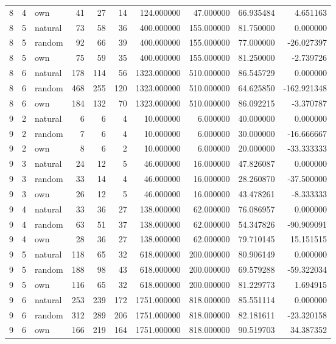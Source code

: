 \begin{table}[htbp]
\begin{tabular}{rrlrrrrrrr}
8 & 4 & own & 41 & 27 & 14 & 124.000000 & 47.000000 & 66.935484 & 4.651163 \\
8 & 5 & natural & 73 & 58 & 36 & 400.000000 & 155.000000 & 81.750000 & 0.000000 \\
8 & 5 & random & 92 & 66 & 39 & 400.000000 & 155.000000 & 77.000000 & -26.027397 \\
8 & 5 & own & 75 & 59 & 35 & 400.000000 & 155.000000 & 81.250000 & -2.739726 \\
8 & 6 & natural & 178 & 114 & 56 & 1323.000000 & 510.000000 & 86.545729 & 0.000000 \\
8 & 6 & random & 468 & 255 & 120 & 1323.000000 & 510.000000 & 64.625850 & -162.921348 \\
8 & 6 & own & 184 & 132 & 70 & 1323.000000 & 510.000000 & 86.092215 & -3.370787 \\
9 & 2 & natural & 6 & 6 & 4 & 10.000000 & 6.000000 & 40.000000 & 0.000000 \\
9 & 2 & random & 7 & 6 & 4 & 10.000000 & 6.000000 & 30.000000 & -16.666667 \\
9 & 2 & own & 8 & 6 & 2 & 10.000000 & 6.000000 & 20.000000 & -33.333333 \\
9 & 3 & natural & 24 & 12 & 5 & 46.000000 & 16.000000 & 47.826087 & 0.000000 \\
9 & 3 & random & 33 & 14 & 4 & 46.000000 & 16.000000 & 28.260870 & -37.500000 \\
9 & 3 & own & 26 & 12 & 5 & 46.000000 & 16.000000 & 43.478261 & -8.333333 \\
9 & 4 & natural & 33 & 36 & 27 & 138.000000 & 62.000000 & 76.086957 & 0.000000 \\
9 & 4 & random & 63 & 51 & 37 & 138.000000 & 62.000000 & 54.347826 & -90.909091 \\
9 & 4 & own & 28 & 36 & 27 & 138.000000 & 62.000000 & 79.710145 & 15.151515 \\
9 & 5 & natural & 118 & 65 & 32 & 618.000000 & 200.000000 & 80.906149 & 0.000000 \\
9 & 5 & random & 188 & 98 & 43 & 618.000000 & 200.000000 & 69.579288 & -59.322034 \\
9 & 5 & own & 116 & 65 & 32 & 618.000000 & 200.000000 & 81.229773 & 1.694915 \\
9 & 6 & natural & 253 & 239 & 172 & 1751.000000 & 818.000000 & 85.551114 & 0.000000 \\
9 & 6 & random & 312 & 289 & 206 & 1751.000000 & 818.000000 & 82.181611 & -23.320158 \\
9 & 6 & own & 166 & 219 & 164 & 1751.000000 & 818.000000 & 90.519703 & 34.387352 \\

\end{tabular}
\end{table}
